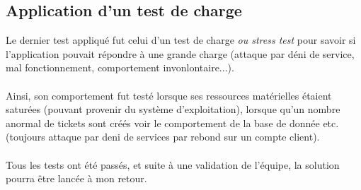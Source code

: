 \subsection{Application d'un test de charge}

Le dernier test appliqué fut celui d'un test de charge \textit{ou stress test} pour savoir si l'application pouvait répondre à une grande charge (attaque par déni de service, mal fonctionnement, comportement invonlontaire...).
\\ \\
Ainsi, son comportement fut testé lorsque ses ressources matérielles étaient saturées (pouvant provenir du système d'exploitation), lorsque qu'un nombre anormal de tickets sont créés voir le comportement de la base de donnée etc. (toujours attaque par deni de services par rebond sur un compte client).
\\ \\
Tous les tests ont été passés, et suite à une validation de l'équipe, la solution pourra être lancée à mon retour.